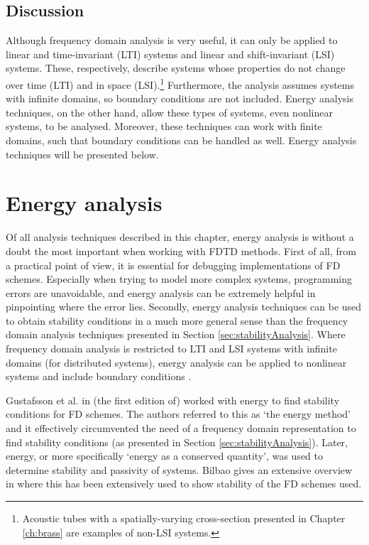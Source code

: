 {{\subsection{Discussion}
Although frequency domain analysis is very useful, it can only be applied to linear and time-invariant (LTI) systems and linear and shift-invariant (LSI) systems. These, respectively, describe systems whose properties do not change over time (LTI) and in space (LSI).\footnote{Acoustic tubes with a spatially-varying cross-section presented in Chapter \ref{ch:brass} are examples of non-LSI systems.} Furthermore, the analysis assumes systems with infinite domains, so boundary conditions are not included. Energy analysis techniques, on the other hand, allow these types of systems, even nonlinear systems, to be analysed. Moreover, these techniques can work with finite domains, such that boundary conditions can be handled as well. Energy analysis techniques will be presented below.

\section{Energy analysis}\label{sec:energyAnalysis}
Of all analysis techniques described in this chapter, energy analysis is without a doubt the most important when working with FDTD methods. 
First of all, from a practical point of view, it is essential for debugging implementations of FD schemes. Especially when trying to model more complex systems, programming errors are unavoidable, and energy analysis can be extremely helpful in pinpointing where the error lies. 
Secondly, energy analysis techniques can be used to obtain stability conditions in a much more general sense than the frequency domain analysis techniques presented in Section \ref{sec:stabilityAnalysis}. Where frequency domain analysis is restricted to LTI and LSI systems with infinite domains (for distributed systems), energy analysis can be applied to nonlinear systems and include boundary conditions \cite{theBible}. 

Gustafsson et al. in (the first edition of) \cite{Gustafsson2013} worked with energy to find stability conditions for FD schemes. The authors referred to this as `the energy method' and it effectively circumvented the need of a frequency domain representation to find stability conditions (as presented in Section \ref{sec:stabilityAnalysis}). Later, energy, or more specifically `energy as a conserved quantity', was used to determine stability and passivity of systems. Bilbao gives an extensive overview in \cite{theBible} where this has been extensively used to show stability of the FD schemes used. 

}}
